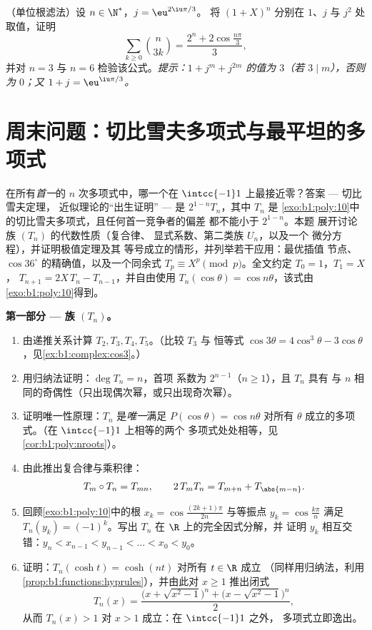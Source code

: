 \begin{exercise}[$\star\star$]\label{exo:b1:poly:12}
（单位根滤法）设 $n \in \N^*$，$j = \eu^{2\iu\pi/3}$。
将 $(1 + X)^n$ 分别在 $1$、$j$ 与 $j^2$ 处取值，证明
\[
\sum_{k \geq 0} \binom{n}{3k}
= \frac{2^n + 2\cos\frac{n\pi}{3}}{3} ,
\]
并对 $n = 3$ 与 $n = 6$ 检验该公式。\emph{提示：$1 +
j^m + j^{2m}$ 的值为 $3$（若 $3 \mid m$），否则为 $0$；又 $1 +
j = \eu^{\iu\pi/3}$。}
\end{exercise}

\section{周末问题：切比雪夫多项式与最平坦的多项式}

\begin{problem}\label{pb:b1:poly:1}
在所有\emph{首一}的 $n$ 次多项式中，哪一个在
$\intcc{-1}1$ 上最接近零？答案 --- 切比雪夫定理，
近似理论的“出生证明” --- 是
$2^{1-n}T_n$，其中 $T_n$ 是
\cref{exo:b1:poly:10}中的切比雪夫多项式，且任何首一竞争者的偏差
都不能小于 $2^{1-n}$。本题
展开讨论族 $(T_n)$ 的代数性质（复合律、
显式系数、第二类族 $U_n$，以及一个
微分方程），并证明极值定理及其
等号成立的情形，并列举若干应用：最优插值
节点、$\cos 36^\circ$ 的精确值，以及一个同余式
$T_p \equiv X^p \pmod p$。全文约定 $T_0 = 1$，$T_1 = X$，
$T_{n+1} = 2X\,T_n - T_{n-1}$，并自由使用
$T_n(\cos\theta) = \cos n\theta$，该式由\cref{exo:b1:poly:10}得到。

\medskip
\noindent\textbf{第一部分 --- 族 $(T_n)$。}
\begin{enumerate}
  \item 由递推关系计算 $T_2, T_3, T_4, T_5$。（比较 $T_3$ 与
        恒等式 $\cos3\theta = 4\cos^3\theta -
        3\cos\theta$，见\cref{ex:b1:complex:cos3}。）
  \item 用归纳法证明：$\deg T_n = n$，首项
        系数为 $2^{n-1}$（$n \geq 1$），且 $T_n$ 具有
        与 $n$ 相同的奇偶性（只出现偶次幂，或只出现奇次幂）。
  \item 证明唯一性原理：$T_n$ 是\emph{唯一}满足
        $P(\cos\theta) = \cos n\theta$ 对所有
        $\theta$ 成立的多项式。（在 $\intcc{-1}1$ 上相等的两个
        多项式处处相等，见\cref{cor:b1:poly:nroots}）。
  \item 由此推出复合律与乘积律：
        \[
        T_m \circ T_n = T_{mn},
        \qquad
        2\,T_m T_n = T_{m+n} + T_{\abs{m-n}} .
        \]
  \item 回顾\cref{exo:b1:poly:10}中的根 $x_k =
        \cos\frac{(2k+1)\pi}{2n}$ 与等振点
        $y_k = \cos\frac{k\pi}n$ 满足 $T_n(y_k) = (-1)^k$。写出
        $T_n$ 在 $\R$ 上的完全因式分解，并
        证明 $y_k$ 相互交错：$y_n < x_{n-1} < y_{n-1}
        < \dots < x_0 < y_0$。
  \item 证明：$T_n(\cosh t) = \cosh(nt)$ 对所有 $t \in \R$ 成立
        （同样用归纳法，利用
        \cref{prop:b1:functions:hyprules}），并由此对 $x
        \geq 1$ 推出闭式
        \[
        T_n(x) = \frac{\bigl(x + \sqrt{x^2 - 1}\bigr)^n +
        \bigl(x - \sqrt{x^2 - 1}\bigr)^n}{2} ,
        \]
        从而 $T_n(x) > 1$ 对 $x > 1$ 成立：在 $\intcc{-1}1$ 之外，
        多项式立即逸出。
\end{enumerate}


\end{problem}
